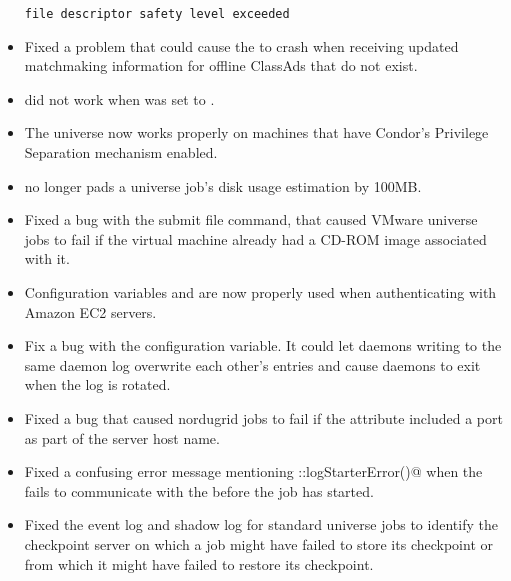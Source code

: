 \begin{itemize}
\begin{verbatim}
file descriptor safety level exceeded
\end{verbatim}

\item Fixed a problem that could cause the  to crash
when receiving updated matchmaking information for offline ClassAds that do
not exist.

\item {} did not work when
 was set to .

\item The  universe now works properly on machines that 
have Condor's Privilege Separation mechanism enabled.

\item {} no longer pads a  universe job's disk usage
estimation by 100MB.

\item Fixed a bug with the  submit file
command, that caused VMware  universe jobs to fail if the virtual
machine already had a CD-ROM image associated with it.

\item Configuration variables  and
 are now properly used when authenticating
with Amazon EC2 servers.

\item Fix a bug with the  configuration variable.
It could let daemons writing to the same daemon log overwrite each other's
entries and cause daemons to exit when the log is rotated.

\item Fixed a bug that caused nordugrid jobs to fail if the
 attribute included a port as part of the server
host name.

\item Fixed a confusing error message mentioning
  \verb@LocalUserLog::logStarterError()@ when the  fails to
  communicate with the  before the job has started.

\item Fixed the event log and shadow log for standard universe jobs to 
identify the checkpoint server on which a job might have failed to store 
its checkpoint or from which it might have failed to restore its checkpoint.


\end{itemize}
